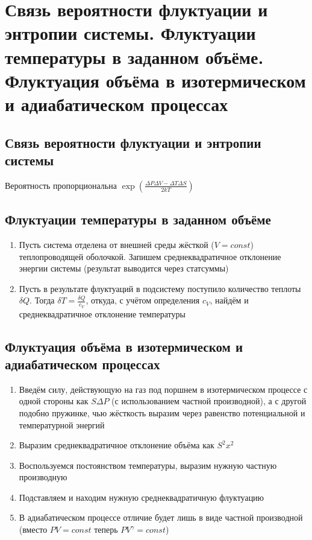 \documentclass[a4paper, 14pt]{article}
\begin{document}
    \section{Связь вероятности флуктуации и энтропии системы.
    Флуктуации температуры в заданном объёме.
    Флуктуация объёма в изотермическом и адиабатическом процессах}
    
    \subsection{Связь вероятности флуктуации и энтропии системы}
    
    Вероятность пропорциональна $\exp \left(\frac{\Delta P \Delta V - \Delta T \Delta S}{2kT}\right)$
    
    \subsection{Флуктуации температуры в заданном объёме}
    
    \begin{enumerate}
        \item Пусть система отделена от внешней среды жёсткой ($V = const$) теплопроводящей оболочкой.
        Запишем среднеквадратичное отклонение энергии системы (результат выводится через статсуммы)
        \item Пусть в результате флуктуаций в подсистему поступило количество теплоты $\delta Q$.
        Тогда $\delta T = \frac{\delta Q}{c_V}$, откуда, с учётом определения $c_V$, найдём и среднеквадратичное
        отклонение температуры
    \end{enumerate}
    
    \subsection{Флуктуация объёма в изотермическом и адиабатическом процессах}
    
    \begin{enumerate}
        \item Введём силу, действующую на газ под поршнем в изотермическом процессе с одной стороны как $S \Delta P$
        (с использованием частной производной), а с другой подобно пружинке, чью жёсткость выразим через равенство
        потенциальной и температурной энергий
        \item Выразим среднеквадратичное отклонение объёма как $S^2 x^2$
        \item Воспользуемся постоянством температуры, выразим нужную частную производную
        \item Подставляем и находим нужную среднеквадратичную флуктуацию
        \item В адиабатическом процессе отличие будет лишь в виде частной производной (вместо $PV = const$ теперь $PV^\gamma = const$)
    \end{enumerate}
    
\end{document}
